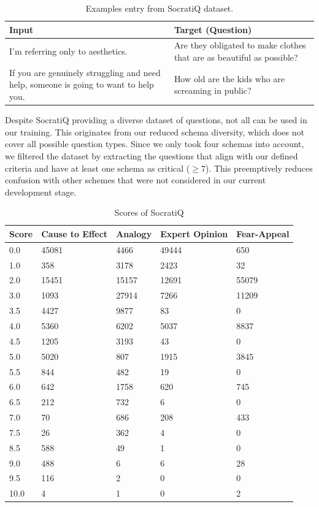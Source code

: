 \documentclass[11pt]{article}
\begin{document}
\begin{table} [ht]
\centering
\begin{tabular}{p{3cm}p{4cm}}
\hline
\textbf{Input} & \textbf{Target (Question)} \\
\hline
I'm referring only to aesthetics. & Are they obligated to make clothes that are as beautiful as possible? \\
\hline
If you are genuinely struggling and need help, someone is going to want to help you. & How old are the kids who are screaming in public? \\
\hline
\end{tabular}
\caption{Examples entry from SocratiQ dataset.}
\label{tab:Excerpt of SocratiQ dataset}
\end{table} 
Despite SocratiQ providing a diverse dataset of questions, not all can be used in our training. This originates from our reduced schema diversity, which does not cover all possible question types. Since we only took four schemas into account, we filtered the dataset by extracting the questions that align with our defined criteria and have at least one schema as critical ($\geq 7$). This preemptively reduces confusion with other schemes that were not considered in our current development stage.
\begin{table}[ht]
    \centering
    \begin{tabular}{p{0.7cm}p{1.4cm}p{1.1cm}p{1.4cm}p{1.3cm}}
        \hline
        \textbf{Score} & \textbf{Cause to Effect} & \textbf{Analogy} & \textbf{Expert Opinion} & \textbf{Fear-Appeal} \\
        \hline
        0.0 & 45081 & 4466 & 49444 & 650 \\
        1.0 &358 &3178  &2423 & 32 \\
        2.0 & 15451 & 15157& 12691& 55079 \\
        3.0& 1093 &27914  &7266 & 11209 \\
        3.5  &4427 &9877 &  83  &0 \\
        \hline
        4.0 & 5360 & 6202 & 5037 & 8837 \\
        4.5   & 1205 & 3193 & 43 & 0 \\
        5.0  & 5020 & 807  & 1915 & 3845 \\
        5.5  & 844 & 482 & 19  & 0 \\
        6.0  & 642  & 1758 &  620& 745 \\
        6.5   & 212 & 732 & 6  & 0 \\
        \hline
        7.0   &  70 & 686 &  208 &  433 \\
        7.5  & 26 & 362  &  4  & 0 \\
        8.5  & 588 & 49  & 1 & 0 \\
        9.0  & 488 & 6  & 6  & 28 \\
        9.5 & 116 &  2 & 0 & 0 \\
        10.0  & 4 & 1  &  0  & 2 \\
        \hline
    \end{tabular}
    \caption{Scores of SocratiQ}
\end{table} 
\end{document}
